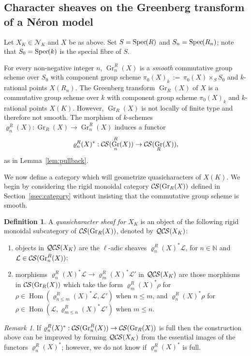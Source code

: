 \documentclass[10pt]{amsart}
\theoremstyle{plain}
\theoremstyle{definition}
\newtheorem{definition}[theorem]{Definition}
\theoremstyle{remark}
\newtheorem{remark}[theorem]{Remark}
\newcommand{\NN}{{\mathbb{N}}}
\newcommand{\Fq}{k}
\DeclareMathOperator{\Hom}{Hom}
\DeclareMathOperator{\Gr}{Gr}
\newcommand{\Spec}[1]{{\operatorname{Spec}\hskip-1pt( #1 )}}
\newcommand{\ceq}{{\, :=\, }}
\newcommand{\cs}[1]{{\mathcal{#1}}}
\newcommand{\CS}{{\mathcal{C\hskip-0.8pt S}}}
\newcommand{\QCS}{{\mathcal{QC\hskip-0.8pt S}}}
\begin{document}
\subsection{Character sheaves on the Greenberg transform of a N\'eron model} \label{ssec:CS_on_GN}
 
Let $X_K \in \mathcal{N}_K$ and $X$ be as above.
Set $S = \Spec{R}$ and $S_n = \Spec{R_n}$;
note that $S_0 = \Spec{\Fq}$ is the special fibre of $S$.

For every non-negative integer $n$, $\Gr^R_n(X)$ is a {\it smooth} commutative group scheme over $S_0$
with component group scheme $\pi_0(X)_{\Fq} \ceq \pi_0(X) \times_S S_0$ and $\Fq$-rational points $X(R_n).$
%
The Greenberg transform $\Gr_R(X)$ of $X$ is a commutative group scheme over $\Fq$
with component group scheme $\pi_0(X)_{\Fq}$
and $\Fq$-rational points $X(K).$
However, $\Gr_R(X)$ is not locally of finite type and therefore not smooth.
%
The morphism of $\Fq$-schemes $\varrho^R_n(X) : \Gr_R(X) \to \Gr^R_n(X)$ induces a functor
\[
\varrho^R_n(X)^* : \CS(\Gr^R_n(X)) \to \CS(\Gr_R(X)),
\]
as in Lemma~\ref{lem:pullback}.

We now define a category which will geometrize quasicharacters of $X(K)$.
We begin by considering the rigid monoidal category $\CS(\Gr_R(X))$ defined in Section~\ref{ssec:category} without insisting that the commutative group scheme is smooth.

\begin{definition}
A {\it quasicharacter sheaf for $X_K$} is an object of
the following rigid monoidal subcategory of $\CS(\Gr_R(X))$, denoted by $\QCS(X_K)$:
\begin{enumerate}
\item
objects in $\QCS(X_K)$ are the $\ell$-adic sheaves $\varrho^R_n(X)^*\cs{L}$, for $n\in \NN$ and $\cs{L} \in \CS(\Gr^R_n(X))$; 
\item
morphisms $\varrho^R_n(X)^*\cs{L} \to \varrho^R_m(X)^*\cs{L}'$ in $\QCS(X_K)$ are those morphisms in $\CS(\Gr_R(X))$ which take the form $\varrho^R_m(X)^*\rho$ for $\rho \in \Hom(\varrho^R_{n\leq m}(X)^*\cs{L},\cs{L}')$ when $n\leq m$, and $\varrho^R_n(X)^*\rho$ for $\rho \in \Hom(\cs{L},\varrho^R_{m\leq n}(X)^*\cs{L}')$ when $m\leq n$.
\end{enumerate}

\end{definition}


\begin{remark}
If $\varrho^R_n(X)^* : \CS(\Gr^R_n(X)) \to \CS(\Gr_R(X))$ is full then the construction above can be improved by forming $\QCS(X_K)$ from the essential images of the functors $\varrho^R_n(X)^*$; however, we do not know if $\varrho^R_n(X)^*$ is full.
\end{remark}
\end{document}
